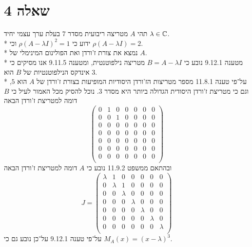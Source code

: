 \section{שאלה 4}
תהי $A$ מטריצה ריבועית מסדר $7$ בעלת ערך עצמי יחיד $\lambda \in \mathbb{C}$. \\*
ידוע כי $\rho{(A - \lambda I)}^2 = 1$ וכי $\rho(A - \lambda I) = 2$. \\*
נמצא את צורת ז'ורדן ואת הפולינום המינימלי של $A$. \\*
מטענה 9.12.1 נובע כי $B = A - \lambda I$ מטריצה נילפוטנטית, ומטענה 9.11.5 אנו מסיקים כי אינדקס הנילפוטנטיות של $B$ הוא $3$. \\*
על־פי טענה 11.8.1 מספר מטריצות הז'ורדן היסודיות המופיעות בצורת ז'ורדן של $A$ הוא $5$, וגם כי מטריצת ז'ורדן היסודית הגדולה ביותר היא מסדר $3$.
נוכל להסיק מכל האמור לעיל כי $B$ דומה למטריצת ז'ורדן הבאה
\[
	\begin{pmatrix}
		 0 & 1 & 0 & 0 & 0 & 0 & 0 \\
		 0 & 0 & 1 & 0 & 0 & 0 & 0 \\
		 0 & 0 & 0 & 0 & 0 & 0 & 0 \\
		 0 & 0 & 0 & 0 & 0 & 0 & 0 \\
		 0 & 0 & 0 & 0 & 0 & 0 & 0 \\
		 0 & 0 & 0 & 0 & 0 & 0 & 0 \\
		 0 & 0 & 0 & 0 & 0 & 0 & 0 \\
	\end{pmatrix}
\]
ובהתאם ממשפט 11.9.2 נובע כי $A$ דומה למטריצת ז'ורדן הבאה
\[
	J = \begin{pmatrix}
		 \lambda & 1 & 0 & 0 & 0 & 0 & 0 \\
		 0 & \lambda & 1 & 0 & 0 & 0 & 0 \\
		 0 & 0 & \lambda & 0 & 0 & 0 & 0 \\
		 0 & 0 & 0 & \lambda & 0 & 0 & 0 \\
		 0 & 0 & 0 & 0 & \lambda & 0 & 0 \\
		 0 & 0 & 0 & 0 & 0 & \lambda & 0 \\
		 0 & 0 & 0 & 0 & 0 & 0 & \lambda \\
	\end{pmatrix}
\]
על־פי טענה 9.12.1 על־כן נובע גם כי $M_A(x) = {(x - \lambda)}^3$.

